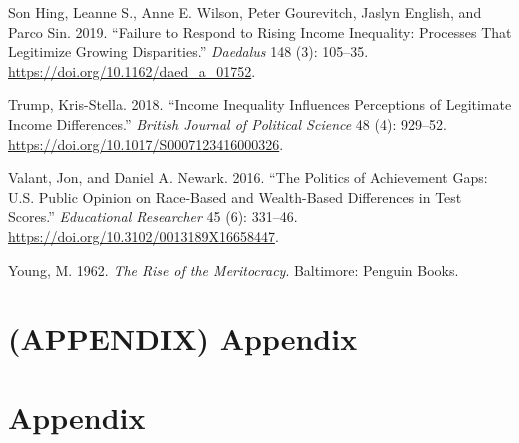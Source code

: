 \documentclass[
  12pt,
  10pt]{article}
\newlength{\cslhangindent}
\newenvironment{CSLReferences}[2] %
 {\begin{list}{}{%
  \setlength{\itemindent}{0pt}
  \setlength{\leftmargin}{0pt}
  \setlength{\parsep}{0pt}
  \ifodd #1
   \setlength{\leftmargin}{\cslhangindent}
   \setlength{\itemindent}{-1\cslhangindent}
  \fi
  \setlength{\itemsep}{#2\baselineskip}}}
 {\end{list}}
\begin{document}
\begin{CSLReferences}{1}{0}
Son Hing, Leanne S., Anne E. Wilson, Peter Gourevitch, Jaslyn English,
and Parco Sin. 2019. {``Failure to {Respond} to {Rising Income
Inequality}: {Processes That Legitimize Growing Disparities}.''}
\emph{Daedalus} 148 (3): 105--35.
\url{https://doi.org/10.1162/daed_a_01752}.

Trump, Kris-Stella. 2018. {``Income {Inequality Influences Perceptions}
of {Legitimate Income Differences}.''} \emph{British Journal of
Political Science} 48 (4): 929--52.
\url{https://doi.org/10.1017/S0007123416000326}.

Valant, Jon, and Daniel A. Newark. 2016. {``The {Politics} of
{Achievement Gaps}: {U}.{S}. {Public Opinion} on {Race-Based} and
{Wealth-Based Differences} in {Test Scores}.''} \emph{Educational
Researcher} 45 (6): 331--46.
\url{https://doi.org/10.3102/0013189X16658447}.

Young, M. 1962. \emph{The Rise of the Meritocracy}. Baltimore: Penguin
Books.

\end{CSLReferences}

\section*{(APPENDIX) Appendix}\label{appendix-appendix}

\appendix \section{Appendix}
\end{document}
